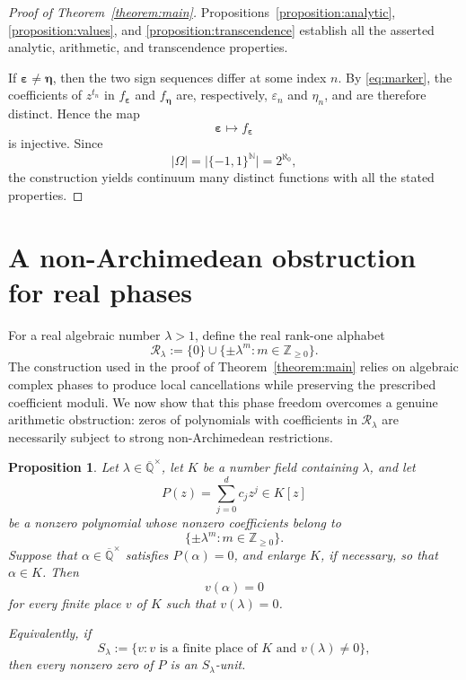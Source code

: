 \documentclass[10pt]{amsart}
\newtheorem{proposition}[theorem]{Proposition}
\theoremstyle{definition}
\theoremstyle{remark}
\numberwithin{equation}{section}
\newcommand{\N}{\mathbb N}
\newcommand{\Z}{\mathbb Z}
\newcommand{\Qbar}{\overline{\mathbb Q}}
\newcommand{\Rset}{\mathcal R}
\newcommand{\abs}[1]{\lvert #1\rvert}
\begin{document}
\begin{proof}[Proof of Theorem~\ref{theorem:main}]
Propositions~\ref{proposition:analytic},
\ref{proposition:values}, and
\ref{proposition:transcendence} establish all the asserted analytic,
arithmetic, and transcendence properties.

If $\boldsymbol\varepsilon\neq\boldsymbol\eta$, then the two sign sequences
differ at some index $n$. By \eqref{eq:marker}, the coefficients of
$z^{t_n}$ in $f_{\boldsymbol\varepsilon}$ and
$f_{\boldsymbol\eta}$ are, respectively, $\varepsilon_n$ and $\eta_n$,
and are therefore distinct. Hence the map
\[
        \boldsymbol\varepsilon
        \longmapsto
        f_{\boldsymbol\varepsilon}
\]
is injective. Since
\[
        \abs{\Omega}
        =
        \abs{\{-1,1\}^{\N}}
        =
        2^{\aleph_0},
\]
the construction yields continuum many distinct functions with all the
stated properties.
\end{proof}

\section{A non-Archimedean obstruction for real phases}
\label{section:real-phases}

For a real algebraic number $\lambda>1$, define the real rank-one alphabet
\begin{equation}\label{eq:Rlambda}
        \Rset_\lambda
        :=
        \{0\}\cup
        \{\pm\lambda^m:m\in\Z_{\geq0}\}.
\end{equation}
The construction used in the proof of Theorem~\ref{theorem:main} relies on
algebraic complex phases to produce local cancellations while preserving the
prescribed coefficient moduli. We now show that this phase freedom overcomes
a genuine arithmetic obstruction: zeros of polynomials with coefficients in
$\Rset_\lambda$ are necessarily subject to strong non-Archimedean
restrictions.

\begin{proposition}\label{proposition:real-obstruction}
Let $\lambda\in\Qbar^\times$, let $K$ be a number field containing
$\lambda$, and let
\[
        P(z)=\sum_{j=0}^{d}c_jz^j\in K[z]
\]
be a nonzero polynomial whose nonzero coefficients belong to
\[
        \{\pm\lambda^m:m\in\Z_{\geq0}\}.
\]
Suppose that $\alpha\in\Qbar^\times$ satisfies $P(\alpha)=0$, and enlarge
$K$, if necessary, so that $\alpha\in K$. Then
\[
        v(\alpha)=0
\]
for every finite place $v$ of $K$ such that $v(\lambda)=0$.

Equivalently, if
\[
        S_\lambda
        :=
        \{v:v \text{ is a finite place of }K
        \text{ and }v(\lambda)\neq0\},
\]
then every nonzero zero of $P$ is an $S_\lambda$-unit.
\end{proposition}
\end{document}
